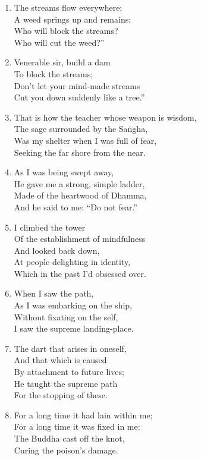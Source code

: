 \documentclass[10pt, openany]{book}
\newcommand*{\vleftofline}[1]{\leavevmode\llap{#1}}
\begin{document}
\begin{enumerate}
\item The streams flow everywhere;\\
A weed springs up and remains;\\
Who will block the streams?\\
Who will cut the weed?”

\item \vleftofline{“}Venerable sir, build a dam\\
To block the streams;\\
Don’t let your mind-made streams\\
Cut you down suddenly like a tree.”

\item That is how the teacher whose weapon is wisdom,\\
The sage surrounded by the Saṅgha,\\
Was my shelter when I was full of fear,\\
Seeking the far shore from the near.

\item As I was being swept away,\\
He gave me a strong, simple ladder,\\
Made of the heartwood of Dhamma,\\
And he said to me: “Do not fear.”

\item I climbed the tower \\
Of the establishment of mindfulness\\
And looked back down,\\
At people delighting in identity,\\
Which in the past I’d obsessed over.

\item When I saw the path,\\
As I was embarking on the ship,\\
Without fixating on the self,\\
I saw the supreme landing-place.

\item The dart that arises in oneself,\\
And that which is caused \\
By attachment to future lives;\\
He taught the supreme path\\
For the stopping of these.

\item For a long time it had lain within me;\\
For a long time it was fixed in me:\\
The Buddha cast off the knot,\\
Curing the poison’s damage.


\end{enumerate}
\end{document}
